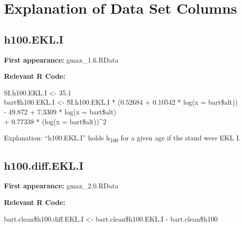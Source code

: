 \section{Explanation of Data Set Columns}

\subsection{h100.EKL.I}
\textbf{First appearance:} gmax\_1.6.RData

\textbf{Relevant R Code:}

\begin{rcode}
  SI.h100.EKL.I <- 35.1 \\
  bart\$h100.EKL.I <- \=SI.h100.EKL.I * (0.52684 + 0.10542 * log(x = bart\$alt)) \\
  \>- 49.872 + 7.3309 * log(x = bart\$alt) \\
  \>+ 0.77338 * (log(x = bart\$alt))\textasciicircum 2
\end{rcode}

Explanation: ``h100.EKL.I'' holds h\textsubscript{100} for a given age if the stand were EKL I.

\subsection{h100.diff.EKL.I}
\textbf{First appearance:} gmax\_2.0.RData

\textbf{Relevant R Code:}

\begin{rcode}
  bart.clean\$h100.diff.EKL.I <- bart.clean\$h100.EKL.I - bart.clean\$h100
\end{rcode}

